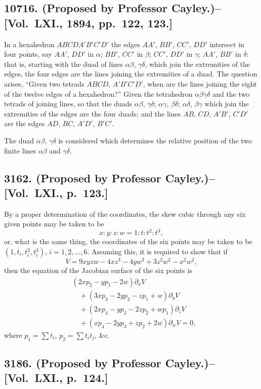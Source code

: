 \documentclass[11pt,a4paper]{book}
\begin{document}
\subsection*{10716. (Proposed by Professor Cayley.)\---[Vol.~LXI., 1894, pp.~122, 123.]}

In a hexahedron $ABCDA'B'C'D'$ the edges $AA'$, $BB'$, $CC'$, $DD'$ intersect in four points, say $AA'$, $DD'$ in $\alpha$; $BB'$, $CC'$ in $\beta$; $CC'$, $DD'$ in $\gamma$; $AA'$, $BB'$ in $\delta$: that is, starting with the duad of lines $\alpha\beta$, $\gamma\delta$, which join the extremities of the edges, the four edges are the lines joining the extremities of a duad. The question arises, ``Given two tetrads $ABCD$, $A'B'C'D'$, when are the lines joining the eight of the twelve edges of a hexahedron?'' Given the tetrahedron $\alpha\beta\gamma\delta$ and the two tetrads of joining lines, so that the duads $\alpha\beta$, $\gamma\delta$; $\alpha\gamma$, $\beta\delta$; $\alpha\delta$, $\beta\gamma$ which join the extremities of the edges are the four duads; and the lines $AB$, $CD$, $A'B'$, $C'D'$ are the edges $AD$, $BC$, $A'D'$, $B'C'$.

The duad $\alpha\beta$, $\gamma\delta$ is considered which determines the relative position of the two finite lines $\alpha\beta$ and $\gamma\delta$.

\subsection*{3162. (Proposed by Professor Cayley.)\---[Vol.~LXI., p.~123.]}

By a proper determination of the coordinates, the skew cubic through any six given points may be taken to be
\[
x:y:z:w = 1:t:t^2:t^3,
\]
or, what is the same thing, the coordinates of the six points may be taken to be $(1,t_i,t_i^2,t_i^3)$, $i=1,2,\ldots,6$. Assuming this, it is required to show that if
\[
V = 9xyzw - 4xz^3 - 4yw^3 + 3z^2w^2 - x^2w^2,
\]
then the equation of the Jacobian surface of the six points is
\[
\begin{aligned}
&(2xp_2-yp_1-2w)\partial_xV \\
&\quad + (3xp_3-2yp_2-zp_1+w)\partial_yV \\
&\quad + (2xp_4-yp_3-2zp_2+wp_1)\partial_zV \\
&\quad + (xp_4-2yp_3+zp_2+2w)\partial_wV = 0,
\end{aligned}
\]
where $p_1=\sum t_i$, $p_2=\sum t_it_j$, \&c.

\subsection*{3186. (Proposed by Professor Cayley.)\---[Vol.~LXI., p.~124.]}
\end{document}
